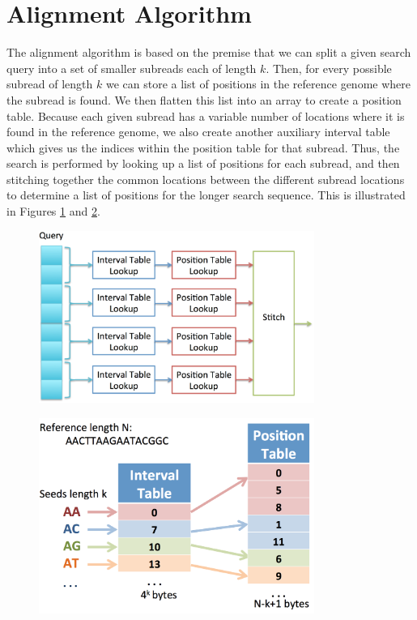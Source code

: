 \documentclass[11pt]{article}
\begin{document}
\section{Alignment Algorithm}

The alignment algorithm is based on the premise that we can split a given search query into a set of smaller subreads each of length $k$. Then, for every possible subread of length $k$ we can store a list of positions in the reference genome where the subread is found. We then flatten this list into an array to create a position table. Because each given subread has a variable number of locations where it is found in the reference genome, we also create another auxiliary interval table which gives us the indices within the position table for that subread. Thus, the search is performed by looking up a list of positions for each subread, and then stitching together the common locations between the different subread locations to determine a list of positions for the longer search sequence.  This is illustrated in Figures \ref{archprocess} and \ref{algorithm}.
\begin{figure}[ht!]
\centering
\includegraphics[width=90mm]{archprocess.png}
\caption{}
\label{archprocess}
\end{figure}

\begin{figure}[ht!]
\centering
\includegraphics[width=90mm]{algorithm.png}
\caption{}
\label{algorithm}
\end{figure}
\end{document}
